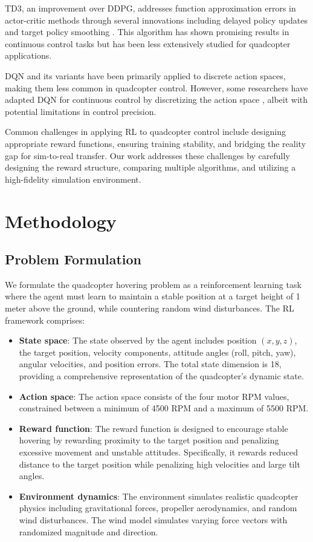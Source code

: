 \documentclass[12pt]{article}
\begin{document}
TD3, an improvement over DDPG, addresses function approximation errors in actor-critic methods through several innovations including delayed policy updates and target policy smoothing \cite{fujimoto2018td3}. This algorithm has shown promising results in continuous control tasks but has been less extensively studied for quadcopter applications.

DQN and its variants have been primarily applied to discrete action spaces, making them less common in quadcopter control. However, some researchers have adapted DQN for continuous control by discretizing the action space \cite{yu2019dqncopter}, albeit with potential limitations in control precision.

Common challenges in applying RL to quadcopter control include designing appropriate reward functions, ensuring training stability, and bridging the reality gap for sim-to-real transfer. Our work addresses these challenges by carefully designing the reward structure, comparing multiple algorithms, and utilizing a high-fidelity simulation environment.

\section{Methodology}
\subsection{Problem Formulation}

We formulate the quadcopter hovering problem as a reinforcement learning task where the agent must learn to maintain a stable position at a target height of 1 meter above the ground, while countering random wind disturbances. The RL framework comprises:

\begin{itemize}
    \item \textbf{State space}: The state observed by the agent includes position $(x, y, z)$, the target position, velocity components, attitude angles (roll, pitch, yaw), angular velocities, and position errors. The total state dimension is 18, providing a comprehensive representation of the quadcopter's dynamic state.
    
    \item \textbf{Action space}: The action space consists of the four motor RPM values, constrained between a minimum of 4500 RPM and a maximum of 5500 RPM.
    
    \item \textbf{Reward function}: The reward function is designed to encourage stable hovering by rewarding proximity to the target position and penalizing excessive movement and unstable attitudes. Specifically, it rewards reduced distance to the target position while penalizing high velocities and large tilt angles.
    
    \item \textbf{Environment dynamics}: The environment simulates realistic quadcopter physics including gravitational forces, propeller aerodynamics, and random wind disturbances. The wind model simulates varying force vectors with randomized magnitude and direction.
\end{itemize}
\end{document}
